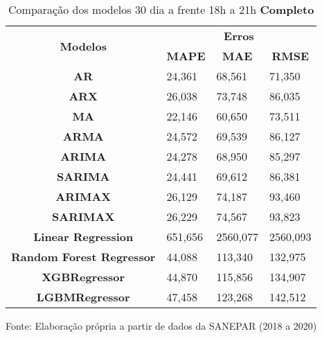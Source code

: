 \begin{table}[H]
	\centering
	\caption{Comparação dos modelos 30 dia a frente 18h a 21h \textbf{Completo} }\label{tb:30-18tcm}
	\begin{tabular}{@{}clll@{}}
		\toprule
		\multirow{2}{*}{\textbf{Modelos}} & \multicolumn{3}{c}{\textbf{Erros}}                                                                       \\ \cmidrule(l){2-4} 
		& \multicolumn{1}{c}{\textbf{MAPE}} & \multicolumn{1}{c}{\textbf{MAE}} & \multicolumn{1}{c}{\textbf{RMSE}} \\ \hline
\textbf{AR}                       & 24,361                            & 68,561                           & 71,350                            \\
\textbf{ARX}                      & 26,038                            & 73,748                           & 86,035                            \\
\textbf{MA}                       & 22,146                            & 60,650                           & 73,511                            \\
\textbf{ARMA}                     & 24,572                            & 69,539                           & 86,127                            \\
\textbf{ARIMA}                    & 24,278                            & 68,950                           & 85,297                            \\
\textbf{SARIMA}                   & 24,441                            & 69,612                           & 86,381                            \\
\textbf{ARIMAX}                   & 26,129                            & 74,187                           & 93,460                            \\
\textbf{SARIMAX}                  & 26,229                            & 74,567                           & 93,823                            \\
\textbf{Linear Regression}        & 651,656                           & 2560,077                         & 2560,093                          \\
\textbf{Random Forest Regressor}  & 44,088                            & 113,340                          & 132,975                           \\
\textbf{XGBRegressor}             & 44,870                            & 115,856                          & 134,907                           \\
\textbf{LGBMRegressor}            & 47,458                            & 123,268                          & 142,512                           \\ \bottomrule
	\end{tabular}

Fonte: Elaboração própria a partir de dados da SANEPAR (2018 a 2020)
\end{table}


